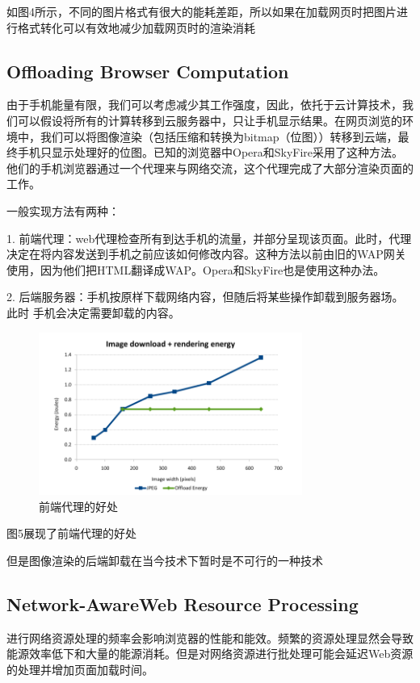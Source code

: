 \documentclass{sig-alternate-05-2015}
\begin{document}
如图4\cite{13}所示，不同的图片格式有很大的能耗差距，所以如果在加载网页时把图片进行格式转化可以有效地减少加载网页时的渲染消耗

\subsection{Offloading Browser Computation}

由于手机能量有限，我们可以考虑减少其工作强度，因此，依托于云计算技术，我们可以假设将所有的计算转移到云服务器中，只让手机显示结果。在网页浏览的环境中，我们可以将图像渲染（包括压缩和转换为bitmap（位图））转移到云端，最终手机只显示处理好的位图。已知的浏览器中Opera和SkyFire采用了这种方法。他们的手机浏览器通过一个代理来与网络交流，这个代理完成了大部分渲染页面的工作。

一般实现方法有两种：

1.	前端代理：web代理检查所有到达手机的流量，并部分呈现该页面。此时，代理决定在将内容发送到手机之前应该如何修改内容。这种方法以前由旧的WAP网关使用，因为他们把HTML翻译成WAP。Opera和SkyFire也是使用这种办法。

2.	后端服务器：手机按原样下载网络内容，但随后将某些操作卸载到服务器场。 此时
手机会决定需要卸载的内容。

\begin{figure}[htbp]
	\centering
	\includegraphics[width=3.4in]{./figure5}
	\caption{前端代理的好处}\label{fig:tasks}
\end{figure}

图5\cite{13}展现了前端代理的好处

但是图像渲染的后端卸载在当今技术下暂时是不可行的一种技术

\subsection{Network-AwareWeb Resource Processing}

进行网络资源处理的频率会影响浏览器的性能和能效。频繁的资源处理显然会导致能源效率低下和大量的能源消耗。但是对网络资源进行批处理可能会延迟Web资源的处理并增加页面加载时间。
\end{document}
